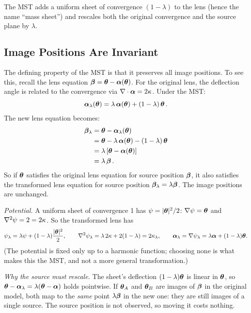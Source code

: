 The MST adds a uniform sheet of convergence
$(1 - \lambda)$ to the lens (hence the name ``mass sheet'') and
rescales both the original convergence and the source plane by
$\lambda$.

\subsection{Image Positions Are Invariant}

The defining property of the MST is that it preserves all image
positions.  To see this, recall the lens equation
$\boldsymbol{\beta} = \boldsymbol{\theta} - \boldsymbol{\alpha}(\boldsymbol{\theta})$.  For the original
lens, the deflection angle is related to the convergence via
$\nabla \cdot \boldsymbol{\alpha} = 2\kappa$.  Under the MST:
\begin{equation}
    \boldsymbol{\alpha}_\lambda(\boldsymbol{\theta}) = \lambda\,\boldsymbol{\alpha}(\boldsymbol{\theta})
    + (1 - \lambda)\,\boldsymbol{\theta} \,.
    \label{eq:mst_alpha}
\end{equation}
The new lens equation becomes:
\begin{align}
    \boldsymbol{\beta}_\lambda
    &= \boldsymbol{\theta} - \boldsymbol{\alpha}_\lambda(\boldsymbol{\theta}) \notag \\
    &= \boldsymbol{\theta} - \lambda\,\boldsymbol{\alpha}(\boldsymbol{\theta})
       - (1 - \lambda)\,\boldsymbol{\theta} \notag \\
    &= \lambda\,[\boldsymbol{\theta} - \boldsymbol{\alpha}(\boldsymbol{\theta})] \notag \\
    &= \lambda\,\boldsymbol{\beta} \,.
    \label{eq:mst_lens_eq}
\end{align}
So if $\boldsymbol{\theta}$ satisfies the original lens equation for source
position $\boldsymbol{\beta}$, it also satisfies the transformed lens
equation for source position $\boldsymbol{\beta}_\lambda = \lambda\boldsymbol{\beta}$.
The image positions are unchanged.

\begin{derivation}
\textit{Potential.}  A uniform sheet of convergence 1 has
$\psi = |\boldsymbol{\theta}|^2/2$: $\nabla\psi = \boldsymbol{\theta}$ and
$\nabla^2\psi = 2 = 2\kappa$.  So the transformed lens has
\[
  \psi_\lambda = \lambda\psi + (1-\lambda)\frac{|\boldsymbol{\theta}|^2}{2},
  \qquad
  \nabla^2\psi_\lambda = \lambda\,2\kappa + 2(1-\lambda) = 2\kappa_\lambda,
  \qquad
  \boldsymbol{\alpha}_\lambda = \nabla\psi_\lambda = \lambda\boldsymbol{\alpha} + (1-\lambda)\boldsymbol{\theta} .
\]
(The potential is fixed only up to a harmonic function; choosing none is
what makes this the MST, and not a more general transformation.)

\textit{Why the source must rescale.}  The sheet's deflection
$(1-\lambda)\boldsymbol{\theta}$ is linear in $\boldsymbol{\theta}$, so
$\boldsymbol{\theta} - \boldsymbol{\alpha}_\lambda = \lambda(\boldsymbol{\theta} - \boldsymbol{\alpha})$ holds pointwise.
If $\boldsymbol{\theta}_A$ and $\boldsymbol{\theta}_B$ are images of $\boldsymbol{\beta}$ in the original
model, both map to the \emph{same} point $\lambda\boldsymbol{\beta}$ in the new one:
they are still images of a single source.  The source position is not
observed, so moving it costs nothing.
\end{derivation}


